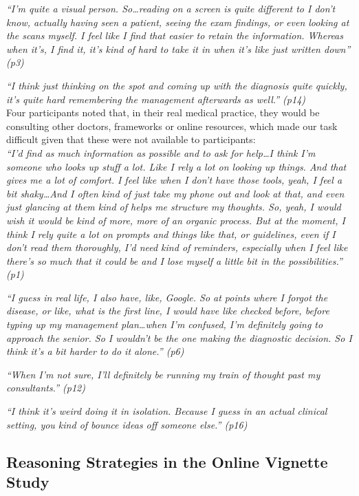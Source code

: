 \documentclass[a4paper, nobind]{templates/ociamthesis}
\begin{document}
\emph{``I'm quite a visual person. So\ldots reading on a screen is quite different to I don't know, actually having seen a patient, seeing the exam findings, or even looking at the scans myself. I feel like I find that easier to retain the information. Whereas when it's, I find it, it's kind of hard to take it in when it's like just written down'' (p3)}

\emph{``I think just thinking on the spot and coming up with the diagnosis quite quickly, it's quite hard remembering the management afterwards as well.'' (p14)}\\

Four participants noted that, in their real medical practice, they would be consulting other doctors, frameworks or online resources, which made our task difficult given that these were not available to participants:\\

\emph{``I'd find as much information as possible and to ask for help\ldots I think I'm someone who looks up stuff a lot. Like I rely a lot on looking up things. And that gives me a lot of comfort. I feel like when I don't have those tools, yeah, I feel a bit shaky\ldots And I often kind of just take my phone out and look at that, and even just glancing at them kind of helps me structure my thoughts. So, yeah, I would wish it would be kind of more, more of an organic process. But at the moment, I think I rely quite a lot on prompts and things like that, or guidelines, even if I don't read them thoroughly, I'd need kind of reminders, especially when I feel like there's so much that it could be and I lose myself a little bit in the possibilities.'' (p1)}

\emph{``I guess in real life, I also have, like, Google. So at points where I forgot the disease, or like, what is the first line, I would have like checked before, before typing up my management plan\ldots when I'm confused, I'm definitely going to approach the senior. So I wouldn't be the one making the diagnostic decision. So I think it's a bit harder to do it alone.'' (p6)}

\emph{``When I'm not sure, I'll definitely be running my train of thought past my consultants.'' (p12)}

\emph{``I think it's weird doing it in isolation. Because I guess in an actual clinical setting, you kind of bounce ideas off someone else.'' (p16)}

\subsection*{Reasoning Strategies in the Online Vignette Study}\label{reasoning-strategies-in-the-online-vignette-study}
\end{document}
